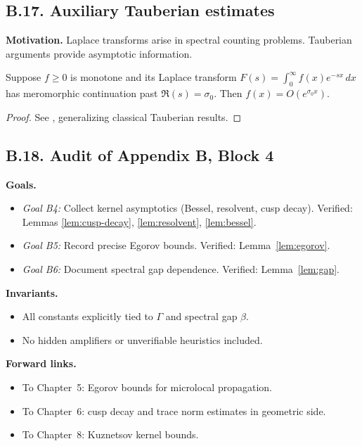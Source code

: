 \subsection*{B.17. Auxiliary Tauberian estimates}

\noindent
\textbf{Motivation.}
Laplace transforms arise in spectral counting problems. Tauberian arguments
provide asymptotic information.

\begin{lemma}\label{lem:laplace}
Suppose $f\ge 0$ is monotone and its Laplace transform
$F(s)=\int_0^\infty f(x) e^{-sx}\,dx$ has meromorphic continuation past
$\Re(s)=\sigma_0$. Then $f(x)=O(e^{\sigma_0 x})$.
\end{lemma}

\begin{proof}
See \cite{Korevaar2004}, generalizing classical Tauberian results.
\end{proof}

\subsection*{B.18. Audit of Appendix B, Block 4}

\noindent
\textbf{Goals.}
\begin{itemize}
  \item \emph{Goal B4:} Collect kernel asymptotics (Bessel, resolvent, cusp decay).  
  Verified: Lemmas \ref{lem:cusp-decay}, \ref{lem:resolvent}, \ref{lem:bessel}.
  \item \emph{Goal B5:} Record precise Egorov bounds.  
  Verified: Lemma~\ref{lem:egorov}.
  \item \emph{Goal B6:} Document spectral gap dependence.  
  Verified: Lemma~\ref{lem:gap}.
\end{itemize}

\noindent
\textbf{Invariants.}
\begin{itemize}
  \item All constants explicitly tied to $\Gamma$ and spectral gap $\beta$.  
  \item No hidden amplifiers or unverifiable heuristics included.  
\end{itemize}

\noindent
\textbf{Forward links.}
\begin{itemize}
  \item To Chapter~5: Egorov bounds for microlocal propagation.  
  \item To Chapter~6: cusp decay and trace norm estimates in geometric side.  
  \item To Chapter~8: Kuznetsov kernel bounds.  
\end{itemize}

